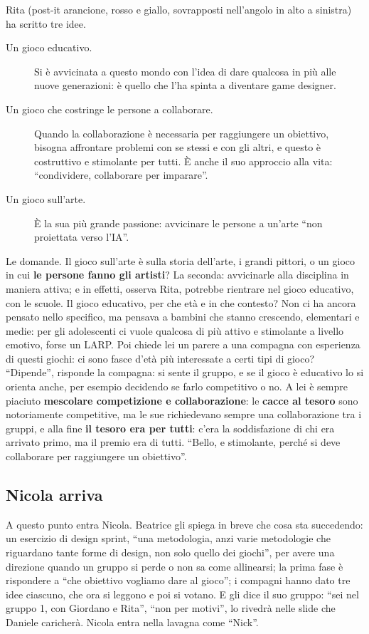 Rita (post-it arancione, rosso e giallo, sovrapposti nell'angolo in alto a sinistra)
ha scritto tre idee.
\begin{description}
  \item[Un gioco educativo.] Si è avvicinata a questo mondo con l'idea di dare
        qualcosa in più alle nuove generazioni: è quello che l'ha spinta a diventare
        game designer.
  \item[Un gioco che costringe le persone a collaborare.] Quando la collaborazione è
        necessaria per raggiungere un obiettivo, bisogna affrontare problemi con se
        stessi e con gli altri, e questo è costruttivo e stimolante per tutti. È anche
        il suo approccio alla vita: ``condividere, collaborare per imparare''.
  \item[Un gioco sull'arte.] È la sua più grande passione: avvicinare le persone a
        un'arte ``non proiettata verso l'IA''.
\end{description}
Le domande. Il gioco sull'arte è sulla storia dell'arte, i grandi pittori, o un gioco
in cui \textbf{le persone fanno gli artisti}? La seconda: avvicinarle alla disciplina
in maniera attiva; e in effetti, osserva Rita, potrebbe rientrare nel gioco educativo,
con le scuole. Il gioco educativo, per che età e in che contesto? Non ci ha ancora
pensato nello specifico, ma pensava a bambini che stanno crescendo, elementari e
medie: per gli adolescenti ci vuole qualcosa di più attivo e stimolante a livello
emotivo, forse un LARP. Poi chiede lei un parere a una compagna con esperienza di
questi giochi: ci sono fasce d'età più interessate a certi tipi di gioco?
``Dipende'', risponde la compagna: si sente il gruppo, e se il gioco è educativo lo
si orienta anche, per esempio decidendo se farlo competitivo o no. A lei è sempre
piaciuto \textbf{mescolare competizione e collaborazione}: le \textbf{cacce al
tesoro} sono notoriamente competitive, ma le sue richiedevano sempre una
collaborazione tra i gruppi, e alla fine \textbf{il tesoro era per tutti}: c'era la
soddisfazione di chi era arrivato primo, ma il premio era di tutti. ``Bello, e
stimolante, perché si deve collaborare per raggiungere un obiettivo''.

\subsection{Nicola arriva}
\label{a7:sec:nicola}

A questo punto entra Nicola. Beatrice gli spiega in breve che cosa sta succedendo:
un esercizio di design sprint, ``una metodologia, anzi varie metodologie che
riguardano tante forme di design, non solo quello dei giochi'', per avere una
direzione quando un gruppo si perde o non sa come allinearsi; la prima fase è
rispondere a ``che obiettivo vogliamo dare al gioco''; i compagni hanno dato tre
idee ciascuno, che ora si leggono e poi si votano. E gli dice il suo gruppo: ``sei nel
gruppo 1, con Giordano e Rita'', ``non per motivi'', lo rivedrà nelle slide che
Daniele caricherà. Nicola entra nella lavagna come ``Nick''.

